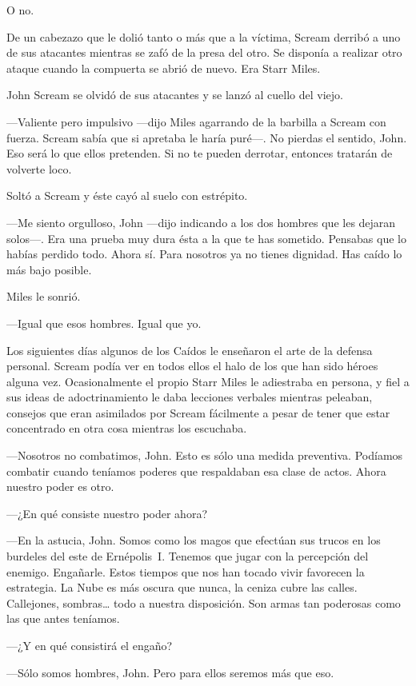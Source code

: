 O no.

De un cabezazo que le dolió tanto o más que a la víctima, Scream derribó a uno de sus atacantes mientras se zafó de la presa del otro. Se disponía a realizar otro ataque cuando la compuerta se abrió de nuevo. Era Starr Miles.

John Scream se olvidó de sus atacantes y se lanzó al cuello del viejo.

---Valiente pero impulsivo ---dijo Miles agarrando de la barbilla a Scream con fuerza. Scream sabía que si apretaba le haría puré---. No pierdas el sentido, John. Eso será lo que ellos pretenden. Si no te pueden derrotar, entonces tratarán de volverte loco.

Soltó a Scream y éste cayó al suelo con estrépito.

---Me siento orgulloso, John ---dijo indicando a los dos hombres que les dejaran solos---. Era una prueba muy dura ésta a la que te has sometido. Pensabas que lo habías perdido todo. Ahora sí. Para nosotros ya no tienes dignidad. Has caído lo más bajo posible.

Miles le sonrió.

---Igual que esos hombres. Igual que yo.

Los siguientes días algunos de los Caídos le enseñaron el arte de la defensa personal. Scream podía ver en todos ellos el halo de los que han sido héroes alguna vez. Ocasionalmente el propio Starr Miles le adiestraba en persona, y fiel a sus ideas de adoctrinamiento le daba lecciones verbales mientras peleaban, consejos que eran asimilados por Scream fácilmente a pesar de tener que estar concentrado en otra cosa mientras los escuchaba.

---Nosotros no combatimos, John. Esto es sólo una medida preventiva. Podíamos combatir cuando teníamos poderes que respaldaban esa clase de actos. Ahora nuestro poder es otro.

---¿En qué consiste nuestro poder ahora?

---En la astucia, John. Somos como los magos que efectúan sus trucos en los burdeles del este de Ernépolis~I. Tenemos que jugar con la percepción del enemigo. Engañarle. Estos tiempos que nos han tocado vivir favorecen la estrategia. La Nube es más oscura que nunca, la ceniza cubre las calles. Callejones, sombras\dots{} todo a nuestra disposición. Son armas tan poderosas como las que antes teníamos.

---¿Y en qué consistirá el engaño?

---Sólo somos hombres, John. Pero para ellos seremos más que eso.

